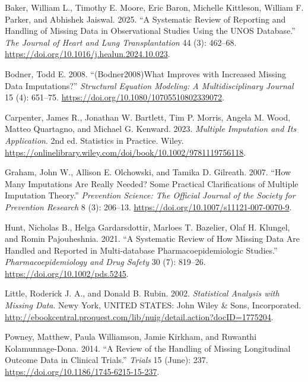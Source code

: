 \documentclass{article}
\newlength{\cslhangindent}
\newenvironment{CSLReferences}[2] %
 {\begin{list}{}{%
  \setlength{\itemindent}{0pt}
  \setlength{\leftmargin}{0pt}
  \setlength{\parsep}{0pt}
  \ifodd #1
   \setlength{\leftmargin}{\cslhangindent}
   \setlength{\itemindent}{-1\cslhangindent}
  \fi
  \setlength{\itemsep}{#2\baselineskip}}}
 {\end{list}}
\begin{document}
\newpage

\label{refs}
\begin{CSLReferences}{1}{0}
Baker, William L., Timothy E. Moore, Eric Baron, Michelle Kittleson,
William F. Parker, and Abhishek Jaiswal. 2025. {``A Systematic Review of
Reporting and Handling of Missing Data in Observational Studies Using
the {UNOS} Database.''} \emph{The Journal of Heart and Lung
Transplantation} 44 (3): 462--68.
\url{https://doi.org/10.1016/j.healun.2024.10.023}.

Bodner, Todd E. 2008. {``({Bodner2008}){What} {Improves} with
{Increased} {Missing} {Data} {Imputations}?''} \emph{Structural Equation
Modeling: A Multidisciplinary Journal} 15 (4): 651--75.
\url{https://doi.org/10.1080/10705510802339072}.

Carpenter, James R., Jonathan W. Bartlett, Tim P. Morris, Angela M.
Wood, Matteo Quartagno, and Michael G. Kenward. 2023. \emph{Multiple
{Imputation} and Its {Application}}. 2nd ed. Statistics in {Practice}.
Wiley.
\url{https://onlinelibrary.wiley.com/doi/book/10.1002/9781119756118}.

Graham, John W., Allison E. Olchowski, and Tamika D. Gilreath. 2007.
{``How Many Imputations Are Really Needed? {Some} Practical
Clarifications of Multiple Imputation Theory.''} \emph{Prevention
Science: The Official Journal of the Society for Prevention Research} 8
(3): 206--13. \url{https://doi.org/10.1007/s11121-007-0070-9}.

Hunt, Nicholas B., Helga Gardarsdottir, Marloes T. Bazelier, Olaf H.
Klungel, and Romin Pajouheshnia. 2021. {``A Systematic Review of How
Missing Data Are Handled and Reported in Multi‐database
Pharmacoepidemiologic Studies.''} \emph{Pharmacoepidemiology and Drug
Safety} 30 (7): 819--26. \url{https://doi.org/10.1002/pds.5245}.

Little, Roderick J. A., and Donald B. Rubin. 2002. \emph{Statistical
{Analysis} with {Missing} {Data}}. Newy York, UNITED STATES: John Wiley
\& Sons, Incorporated.
\url{http://ebookcentral.proquest.com/lib/nuig/detail.action?docID=1775204}.

Powney, Matthew, Paula Williamson, Jamie Kirkham, and Ruwanthi
Kolamunnage-Dona. 2014. {``A Review of the Handling of Missing
Longitudinal Outcome Data in Clinical Trials.''} \emph{Trials} 15
(June): 237. \url{https://doi.org/10.1186/1745-6215-15-237}.


\end{CSLReferences}
\end{document}
